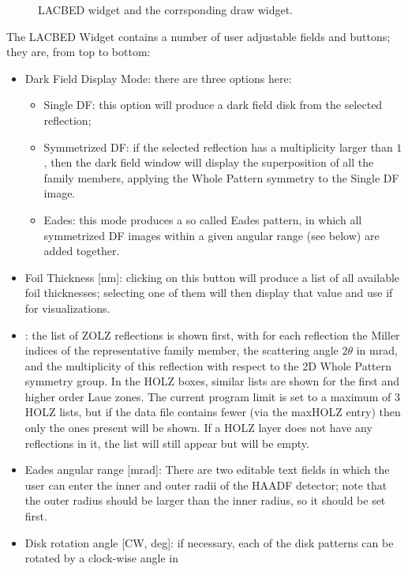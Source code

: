 \documentclass[DIV=calc, paper=letter, fontsize=11pt]{scrartcl}	 %
\begin{document}
\begin{figure}[t]
\leavevmode\centering
{}
\caption{\label{fig:widget2}\textsf{LACBED} widget and the corrsponding draw widget.}
\end{figure}

The LACBED Widget contains a number of user adjustable fields and buttons; they are, from top to bottom:
\begin{itemize}
	\item \textsf{Dark Field Display Mode}: there are three options here: 
	\begin{itemize}
		\item \textsf{Single DF}: this option will produce a dark field disk from the selected reflection;
		\item \textsf{Symmetrized DF}: if the selected reflection has a multiplicity larger than $1$, then 
		the dark field window will display the superposition of all the family members, applying the Whole
		Pattern symmetry to the Single DF image.
		\item \textsf{Eades}: this mode produces a so called Eades pattern, in which all symmetrized DF images
		within a given angular range (see below) are added together.
	\end{itemize}
	\item \textsf{Foil Thickness [nm]}: clicking on this button will produce a list of all available foil thicknesses; selecting 
	one of them will then display that value and use if for visualizations.
	\item {}: the list of ZOLZ reflections is shown first, with for each reflection the Miller 
	indices of the representative family member, the scattering angle $2\theta$ in mrad, and the multiplicity of this 
	reflection with respect to the 2D Whole Pattern symmetry group.  In the HOLZ boxes, similar lists are shown for the first 
	and higher order Laue zones.  The current program limit is set to a maximum of $3$ HOLZ lists, but if the data file contains 
	fewer (via the \textsf{maxHOLZ} entry) then only the ones present will be shown.  If a HOLZ layer does not have any
	reflections in it, the list will still appear but will be empty.
	\item \textsf{Eades angular range [mrad]}: There are two editable text fields in which the user can enter the inner and 
	outer radii of the HAADF detector; note that the outer radius should be larger than the inner radius, so it should be set first.
	\item \textsf{Disk rotation angle [CW, deg]}: if necessary, each of the disk patterns can be rotated by a clock-wise angle in

\end{itemize}
\end{document}
